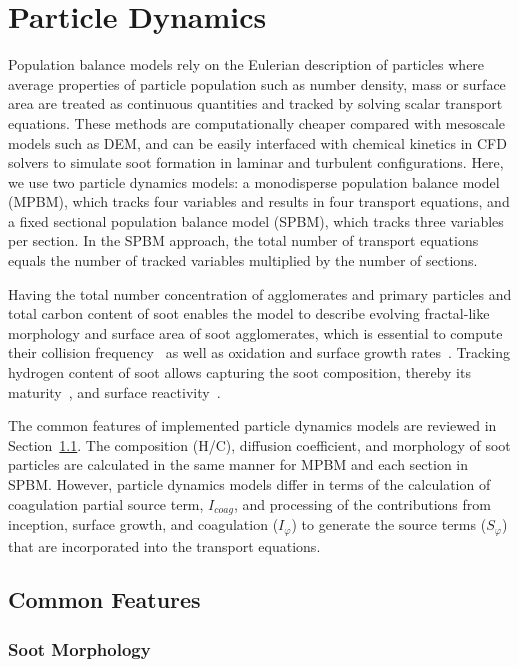 

\section{Particle Dynamics}
Population balance models rely on the Eulerian description of particles where average properties of particle population such as number density, mass or surface area are treated as continuous quantities and tracked by solving scalar transport equations. These methods are computationally cheaper compared with mesoscale models such as DEM, and can be easily interfaced with chemical kinetics in CFD solvers to simulate soot formation in laminar and turbulent configurations. Here, we use two particle dynamics models: a monodisperse population balance model (MPBM), which tracks four variables and results in four transport equations, and a fixed sectional population balance model (SPBM), which tracks three variables per section. In the SPBM approach, the total number of transport equations equals the number of tracked variables multiplied by the number of sections. 

Having the total number concentration of agglomerates and primary particles and total carbon content of soot enables the model to describe evolving fractal-like morphology and surface area of soot agglomerates, which is essential to compute their collision frequency~\citep{mulholland1988cluster} as well as oxidation and surface growth rates~\citep{kelesidis2019estimating}. Tracking hydrogen content of soot allows capturing the soot composition, thereby its maturity~\citep{kholghy2016core}, and surface reactivity~\citep{blanquart2009analyzing}.

The common features of implemented particle dynamics models are reviewed in Section~\ref{sec:pdynamiccommon}. The composition (H/C), diffusion coefficient, and morphology of soot particles are calculated in the same manner for MPBM and each section in SPBM. However, particle dynamics models differ in terms of the calculation of coagulation partial source term, $I_{coag}$, and processing of the contributions from inception, surface growth, and coagulation ($I_{\varphi}$) to generate the source terms ($S_{\varphi}$) that are incorporated into the transport equations.

\subsection{Common Features}
\label{sec:pdynamiccommon}
\subsubsection{Soot Morphology}
\label{sec:sootmorphology}


